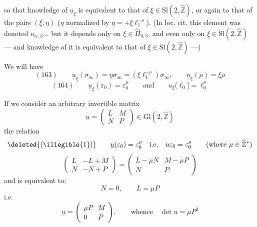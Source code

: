 so that knowledge of $\underline u_\xi$ is equivalent to that  of $\xi\in\mathrm{Sl}(2,\widehat{\mathbb Z})$, or again to that of the pairs $(\xi,\eta)$ ($\eta$ normalized by $\eta=+\xi\ell_1^{-\nu}$). (In loc. cit. this element was denoted $u_{\alpha,\beta}$... but it depends only on $\xi\in\widehat{\Pi}_{0,3}$, and even only on $\underline\xi\in\mathrm{Sl}(2,\widehat{\mathbb Z})$ --- and knowledge of it is equivalent to that of $\underline\xi\in\mathrm{Sl}(2,\widehat{\mathbb Z})$ ---)



 We will have
\[
(163)\qquad
\underline u_\xi(\sigma_\infty)
=\eta\sigma_\infty
=(\xi \ell_1^{-\nu})\sigma_\infty,
\qquad
\underline u_\xi(\rho)=\xi\rho
\]
\[
(164)\qquad
\underline u_\xi(\varepsilon_0)=\varepsilon_0^\mu
\qquad\text{and}\qquad
u_\xi(\ell_0]=\ell_0^\mu
\]


If we consider an arbitrary invertible matrix
\[
\underline u=\begin{pmatrix}L&M\\N&P\end{pmatrix}
\in\mathrm{Gl}(2,\widehat{\mathbb Z})
\]
the relation
\[
\deleted{(\illegible{1})}\qquad
\underline u(\varepsilon_0)=\varepsilon_0^\mu
\quad\text{i.e.}\quad
u\varepsilon_0=\varepsilon_0^\mu
\qquad(\text{where }\mu\in\widehat{\mathbb Z}^{*})
\]
\[
\begin{pmatrix}L&-L+M\\N&-N+P\end{pmatrix}
=\begin{pmatrix}L-\mu N&M-\mu P\\N&P\end{pmatrix}
\]
and is equivalent to: 
\[
N=0,\qquad L=\mu P
\]
i.e.
\[
\underline u=\begin{pmatrix}\mu P&M\\0&P\end{pmatrix},
\qquad\text{whence}\quad\det u=\mu P^2
\]

